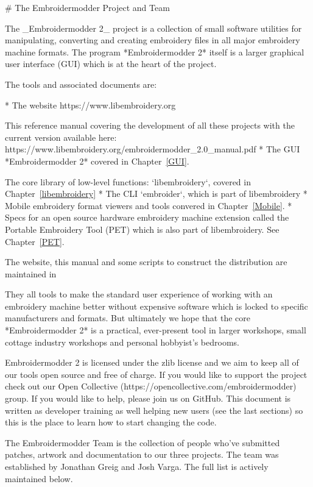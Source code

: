 # The Embroidermodder Project and Team

The _Embroidermodder 2_ project is a collection of small software
utilities for manipulating, converting and creating embroidery files in all
major embroidery machine formats. The program *Embroidermodder 2* itself
is a larger graphical user interface (GUI) which is at the heart of the project.

The tools and associated documents are:

* The website https://www.libembroidery.org\item This reference manual covering the development of all these projects with the current version available here: https://www.libembroidery.org/embroidermodder_2.0_manual.pdf
* The GUI *Embroidermodder 2* covered in Chapter~\ref{GUI}.\item The core library of low-level functions: `libembroidery`, covered in Chapter~\ref{libembroidery}
* The CLI `embroider`, which is part of libembroidery
* Mobile embroidery format viewers and tools convered in Chapter~\ref{Mobile}.
* Specs for an open source hardware embroidery machine extension called the Portable Embroidery Tool (PET) which is also part of libembroidery. See Chapter~\ref{PET}.

The website, this manual and some scripts to construct the distribution are
maintained in %

They all tools to make the standard
user experience of working with an embroidery machine better without expensive
software which is locked to specific manufacturers and formats. But ultimately
we hope that the core *Embroidermodder 2* is a practical, ever-present tool in
larger workshops, small cottage industry workshops and personal hobbyist's
bedrooms.

Embroidermodder 2 is licensed under the zlib license and we aim to keep all of our tools open
source and free of charge. If you would like to support the project check out our  Open
Collective (https://opencollective.com/embroidermodder) group.
If you would like to help,
please join us on GitHub. This document is written as developer training as well helping new
users (see the last sections) so this is the place to learn how to start changing the code.

The Embroidermodder Team is the collection of people who've submitted
patches, artwork and documentation to our three projects.
The team was established by Jonathan Greig and Josh Varga.
The full list is actively maintained below.


